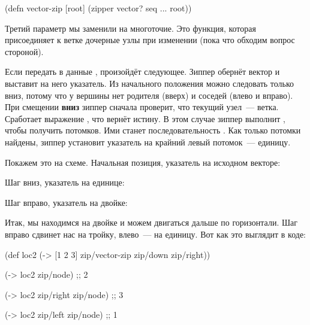 \begin{english}
  \begin{clojure}
(defn vector-zip
  [root]
  (zipper vector?
          seq
          ...
          root))
  \end{clojure}
\end{english}

Третий параметр мы заменили на многоточие. Это функция, которая присоединяет к
ветке дочерные узлы при изменении (пока что обходим вопрос стороной).

Если передать в  данные \code{[1 2 3]}, произойдёт
следующее. Зиппер обернёт вектор и выставит на него указатель. Из начального
положения можно следовать только вниз, потому что у вершины нет родителя (вверх)
и соседей (влево и вправо). При смещении \textbf{вниз} зиппер сначала проверит,
что текущий узел~--- ветка. Сработает выражение , что
вернёт истину. В этом случае зиппер выполнит , чтобы
получить потомков. Ими станет последовательность . Как только
потомки найдены, зиппер установит указатель на крайний левый потомок~---
единицу.

Покажем это на схеме. Начальная позиция, указатель на исходном векторе:

\begin{figure}[H]
  \centering
  
  \label{fig:chart-zip-01}
\end{figure}

Шаг вниз, указатель на единице:

\begin{figure}[H]
  \centering
  
  \label{fig:chart-zip-02}
\end{figure}

Шаг вправо, указатель на двойке:

\begin{figure}[H]
  \centering
  
  \label{fig:chart-zip-03}
\end{figure}

Итак, мы находимся на двойке и можем двигаться дальше по горизонтали. Шаг вправо
сдвинет нас на тройку, влево~--- на единицу. Вот как это выглядит в коде:

\begin{english}
  \begin{clojure}
(def loc2
  (-> [1 2 3]
      zip/vector-zip
      zip/down
      zip/right))

(-> loc2 zip/node)
;; 2

(-> loc2 zip/right zip/node)
;; 3

(-> loc2 zip/left zip/node)
;; 1
  \end{clojure}
\end{english}

